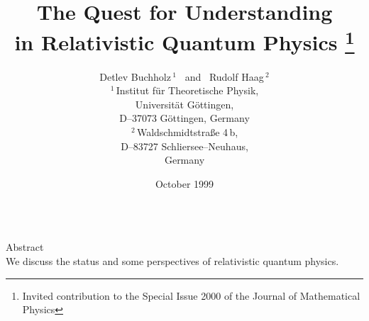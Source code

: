 \newcommand{\sA}{{\underline{A}_{}}}
\newcommand{\sB}{{\underline{B}_{}}}
\newcommand{\sC}{{\underline{C}_{}}}
\newcommand{\sfA}{\underline{{\mathfrak A}}}
\newcommand{\sa}{\underline{\alpha}}
%
\newlength{\dinwidth}
\newlength{\dinmargin}
%
\setlength{\dinwidth}{21.0cm}
\setlength{\textwidth}{15.2cm}
\setlength{\textheight}{23.0cm}
%
\setlength{\dinmargin}{\dinwidth}
\addtolength{\dinmargin}{-\textwidth}
\setlength{\dinmargin}{0.5\dinmargin}
\setlength{\oddsidemargin}{-1.0in}
\addtolength{\oddsidemargin}{\dinmargin}
\setlength{\evensidemargin}{\oddsidemargin}
\setlength{\marginparwidth}{0.9\dinmargin}
\setlength{\marginparsep}{8pt}
\setlength{\marginparpush}{5pt}
%
\setlength{\columnseprule}{0mm}
\setlength{\columnsep}{7mm}
%
\setlength{\topmargin}{-0.5in}
\setlength{\headheight}{30pt}
\setlength{\headsep}{10pt}
%
\setlength{\footheight}{20pt}
\setlength{\footskip}{20pt}

\title{\sc The Quest for Understanding \\ 
in Relativistic Quantum Physics
\thanks{Invited 
contribution to the Special Issue 2000 of the Journal of Mathematical
Physics}
}
\author{{\sc Detlev Buchholz}$\,^1$ \ and \ 
{\sc Rudolf Haag}$\,^2$ \\
$^1\,${\normalsize  Institut f\"ur Theoretische Physik,}\\
{\normalsize Universit\"at G\"ottingen,}\\
{\normalsize  D--37073 G\"ottingen, Germany}\\[10pt]
$^2\,${\normalsize  Waldschmidtstra{\ss}e 4\,b,}\\
{\normalsize D--83727 Schliersee--Neuhaus,}\\
{\normalsize  Germany}}
{\date{\normalsize \sc October 1999}}
\maketitle
${}$\\[5pt]
\renewcommand{\theequation}{\thesection.\arabic{equation}}
\newtheorem{Definition}{Definition}[section]
\newtheorem{Theorem}[Definition]{Theorem}
\newtheorem{Proposition}[Definition]{Proposition}
\newtheorem{Lemma}[Definition]{Lemma}
\newtheorem{Corollary}[Definition]{Corollary}
\begin{center} {\sc Abstract} \\
{ We discuss the status and some perspectives of 
relativistic quantum physics.}
\end{center} 
